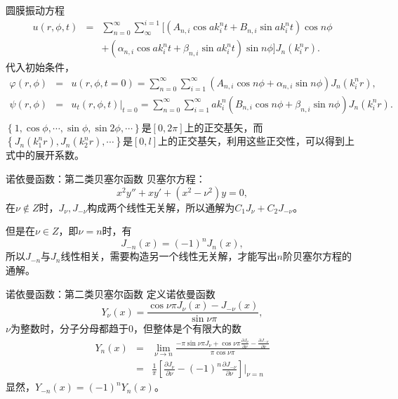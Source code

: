 \documentclass[11pt]{beamer}
\begin{document}
\begin{frame}{圆膜振动方程}
\begin{eqnarray}
u(r,\phi, t) &=& \sum^\infty_{n=0} \sum_{\infty}^{i=1}
[ ( A_{n,i} \cos a k^n_i t + B_{n,i} \sin a k^n_i t ) \cos n \phi 
\nonumber\\
&& + ( \alpha_{n,i} \cos a k^n_i t + \beta_{n,i} \sin a k^n_i t ) \sin n \phi ] J_n (k^n_i r).
\end{eqnarray}
代入初始条件，
\begin{eqnarray}
\varphi(r, \phi) &=& u(r,\phi,t=0) = \sum^\infty_{n=0} \sum^\infty_{i=1} ( A_{n,i} \cos n \phi + \alpha_{n,i} \sin n \phi ) J_n (k^n_i r),
\\
\psi(r, \phi) &=& u_t(r, \phi, t) |_{t=0}
= \sum^\infty_{n=0} \sum^\infty_{i=1}
ak^n_i ( B_{n,i} \cos n\phi + \beta_{n,i} \sin n \phi ) J_n(k^n_i r).
\nonumber\\
\end{eqnarray}
$\left\{ 1, \cos \phi, \cdots, \sin \phi, \sin 2\phi, \cdots \right\}$是$[0,2\pi]$上的正交基矢，而$ \left\{ J_n(k^n_1 r), J_n(k^n_2 r), \cdots \right\} $是$[0,l]$上的正交基矢，利用这些正交性，可以得到上式中的展开系数。
\end{frame}

\begin{frame}{诺依曼函数：第二类贝塞尔函数}
贝塞尔方程：
\begin{equation}
x^2 y'' + xy' + (x^2 - \nu^2) y = 0,
\end{equation}
在$\nu \notin Z $时，$J_\nu, J_{-\nu}$构成两个线性无关解，所以通解为$ C_1 J_\nu + C_2 J_{-\nu}$。

但是在$\nu \in Z$，即$\nu = n$时，有
\begin{equation}
J_{-n}(x) = (-1)^n J_n (x),
\end{equation}
所以$J_{-n}$与$J_n$线性相关，需要构造另一个线性无关解，才能写出$n$阶贝塞尔方程的通解。
\end{frame}

\begin{frame}{诺依曼函数：第二类贝塞尔函数}
定义诺依曼函数
\begin{equation}
Y_\nu (x) = \frac{ \cos \nu \pi J_\nu (x) - J_{-\nu}(x) }{ \sin \nu \pi},
\end{equation}
$\nu$为整数时，分子分母都趋于0，但整体是个有限大的数
\begin{eqnarray}
Y_n(x) &=& \lim\limits_{\nu \rightarrow n}
\frac{ -\pi \sin \nu \pi J_\nu + \cos \nu \pi \frac{\partial J_\nu}{\partial \nu} - \frac{\partial J_{-\nu}}{\partial \nu} }{ \pi \cos \nu \pi }
\nonumber\\
&=& \frac{1}{\pi}[ \frac{\partial J_\nu}{\partial \nu} - (-1)^n \frac{ \partial J_{-\nu}}{ \partial \nu } ] |_{\nu = n}
\end{eqnarray}
显然，$Y_{-n}(x) = (-1)^n Y_n(x)$。
\end{frame}
\end{document}
